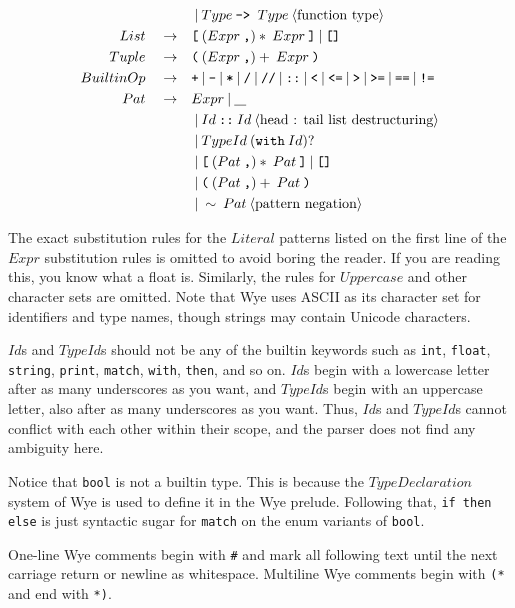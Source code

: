 \documentclass[a4paper, 12pt]{article}
\theoremstyle{myplain}
\theoremstyle{mydefinition}
\theoremstyle{myremark}
\numberwithin{equation} {section}
\numberwithin{figure}   {section}
\numberwithin{table}    {section}
\newcommand{\sepbar}{\: | \:}	%
\newcommand{\substo}{\quad\rightarrow\quad}
\newcommand{\uscore}{\underline{\hspace{0.3cm}}}
\begin{document}
\begin{align*}
& \sepbar Type \: \texttt{-> }Type\:\langle\text{function type}\rangle\\
List \substo& \texttt{[}\: (Expr \: \texttt{,})*\: Expr\: \texttt{]} \sepbar \texttt{[]}\\
Tuple \substo& \texttt{(}\: (Expr \: \texttt{,})+\: Expr\: \texttt{)}\\
BuiltinOp \substo& \texttt{+}\sepbar\texttt{-}\sepbar\texttt{*}\sepbar\texttt{/}\sepbar\texttt{//}\sepbar\texttt{::}\sepbar\texttt{<}\sepbar\texttt{<=}\sepbar\texttt{>}\sepbar\texttt{>=}\sepbar\texttt{==}\sepbar\texttt{!=}\\
Pat \substo& Expr \sepbar \uscore\\
& \sepbar Id\:\texttt{::}\: Id\:\langle\text{head : tail list destructuring}\rangle\\
& \sepbar TypeId \: (\texttt{with}\: Id)?\\
& \sepbar \texttt{[} \: ( Pat\:\texttt{,})*\: Pat \: \texttt{]} \sepbar  \texttt{[]}\\
& \sepbar \texttt{(} \: ( Pat\:\texttt{,})+\: Pat\: \texttt{)}\\
& \sepbar \sim\:Pat \:\langle\text{pattern negation}\rangle
\end{align*}
\pagebreak

The exact substitution rules for the $Literal$ patterns listed on the first line of the $Expr$ substitution rules is omitted to avoid boring the reader. If you are reading this, you know what a float is. Similarly, the rules for $Uppercase$ and other character sets are omitted. Note that Wye uses ASCII as its character set for identifiers and type names, though strings may contain Unicode characters.

$Id$s and $TypeId$s should not be any of the builtin keywords such as \texttt{int}, \texttt{float}, \texttt{string}, \texttt{print}, \texttt{match}, \texttt{with}, \texttt{then}, and so on. $Id$s begin with a lowercase letter after as many underscores as you want, and $TypeId$s begin with an uppercase letter, also after as many underscores as you want. Thus, $Id$s and $TypeId$s cannot conflict with each other within their scope, and the parser does not find any ambiguity here.

Notice that \texttt{bool} is not a builtin type. This is because the $TypeDeclaration$ system of Wye is used to define it in the Wye prelude. Following that, \texttt{if then else} is just syntactic sugar for \texttt{match} on the enum variants of \texttt{bool}.

One-line Wye comments begin with \texttt{\#} and mark all following text until the next carriage return or newline as whitespace. Multiline Wye comments begin with \texttt{(*} and end with \texttt{*)}.
\end{document}
